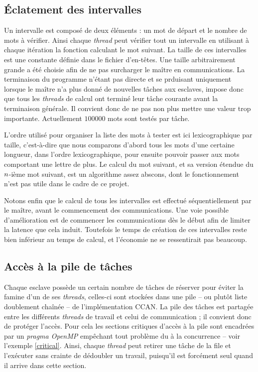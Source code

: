 \subsection{\'Eclatement des intervalles}

Un intervalle est composé de deux éléments : un mot de départ et le nombre de mots à vérifier. Ainsi chaque \emph{thread} peut vérifier tout un intervalle en utilisant à chaque itération la fonction calculant le mot suivant. La taille de ces intervalles est une constante définie dans le fichier d'en-têtes. Une taille arbitrairement grande a été choisie afin de ne pas surcharger le maître en communications. La terminaison du programme n'étant pas directe et se prduisant uniquement lorsque le maître n'a plus donné de nouvelles tâches aux esclaves, impose donc que tous les \emph{threads} de calcul ont terminé leur tâche courante avant la terminaison générale. Il convient donc de ne pas non plus mettre une valeur trop importante. Actuellement $100000$ mots sont testés par tâche.

L'ordre utilisé pour organiser la liste des mots à tester est ici lexicographique par taille, c'est-à-dire que nous comparons d'abord tous les mots d'une certaine longueur, dans l'ordre lexicographique, pour ensuite pouvoir passer aux mots comportant une lettre de plus. Le calcul du mot suivant, et sa version étendue du $\mathnormal{n}$-ième mot suivant, est un algorithme assez abscons, dont le fonctionnement n'est pas utile dans le cadre de ce projet.

Notons enfin que le calcul de tous les intervalles est effectué séquentiellement par le maître, avant le commencement des communications. Une voie possible d'amélioration est de commencer les communications dès le début afin de limiter la latence que cela induit. Toutefois le temps de création de ces intervalles reste bien inférieur au temps de calcul, et l'économie ne se ressentirait pas beaucoup.

\subsection{Accès à la pile de tâches}

Chaque esclave possède un certain nombre de tâches de réserver pour éviter la famine d'un de ses \emph{threads}, celles-ci sont stockées dans une pile -- ou plutôt liste doublement chaînée -- de l'implémentation \textsf{CCAN}. La pile des tâches est partagée entre les différents \emph{threads} de travail et celui de communication ; il convient donc de protéger l'accès. Pour cela les sections critiques d'accès à la pile sont encadrées par un \emph{pragma OpenMP} empêchant tout problème du à la concurrence -- voir l'exemple \ref{critical}. Ainsi, chaque \emph{thread} peut retirer une tâche de la file et l'exécuter sans crainte de dédoubler un travail, puisqu'il est forcément seul quand il arrive dans cette section. 

